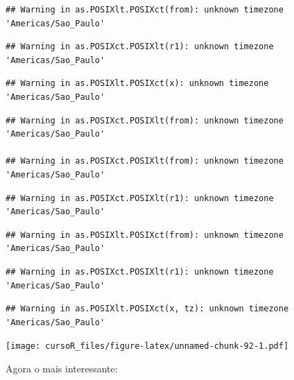 \documentclass[]{book}
\theoremstyle{definition}
\theoremstyle{definition}
\theoremstyle{definition}
\theoremstyle{remark}
\begin{document}
\begin{verbatim}
## Warning in as.POSIXlt.POSIXct(from): unknown timezone 'Americas/Sao_Paulo'
\end{verbatim}

\begin{verbatim}
## Warning in as.POSIXct.POSIXlt(r1): unknown timezone 'Americas/Sao_Paulo'
\end{verbatim}

\begin{verbatim}
## Warning in as.POSIXlt.POSIXct(x): unknown timezone 'Americas/Sao_Paulo'
\end{verbatim}

\begin{verbatim}
## Warning in as.POSIXct.POSIXlt(from): unknown timezone 'Americas/Sao_Paulo'

## Warning in as.POSIXct.POSIXlt(from): unknown timezone 'Americas/Sao_Paulo'
\end{verbatim}

\begin{verbatim}
## Warning in as.POSIXct.POSIXlt(r1): unknown timezone 'Americas/Sao_Paulo'
\end{verbatim}

\begin{verbatim}
## Warning in as.POSIXlt.POSIXct(from): unknown timezone 'Americas/Sao_Paulo'
\end{verbatim}

\begin{verbatim}
## Warning in as.POSIXct.POSIXlt(r1): unknown timezone 'Americas/Sao_Paulo'
\end{verbatim}

\begin{verbatim}
## Warning in as.POSIXlt.POSIXct(x, tz): unknown timezone 'Americas/Sao_Paulo'
\end{verbatim}

\texttt{[image: cursoR\_files/figure-latex/unnamed-chunk-92-1.pdf]}

Agora o mais interessante:
\end{document}
